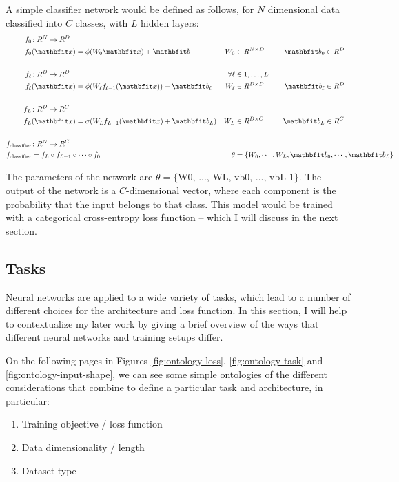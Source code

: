 A simple classifier network would be defined as follows, for $N$ dimensional data classified into $C$ classes, with $L$ hidden layers:
\begin{align}
\label{notation:classifier}
\begin{aligned}
    \vfdef{f_0}{N}{D} \\
    f_{0}&(\x) = \phi(W_0 \x) + \vb &
    W_0 &\in \R^{N\times D} &
    \vb_0 &\in \R^{D}
\\ \\%
    \vfdef{f_\l}{D}{D} & \forall \l &\in 1,\dots,L \quad \\
    f_\l&(\x) = \phi(W_\l f_{\l-1}(\x)) + \vb_\l &
    W_\l &\in \R^{D\times D} \quad &
    \vb_\l &\in \R^{D}
\\ \\%
    \vfdef{f_L}{D}{C} \\
    f_{L}&(\x) = \sigma(W_L f_{L-1}(\x) + \vb_L) &
    W_L &\in \R^{D \times C} &
    \vb_L &\in \R^{C}
\\ \\%
    \vfdef{f_{\text{classifier}}}{N}{C} \\
    f_{\text{classifier}}& = f_L \circ f_{L-1} \circ \cdots \circ f_0 &
    \theta &= \rlap{\{$W_0, \cdots, W_L, \vb_0, \cdots, \vb_L \} $}
\end{aligned}
\end{align}

The parameters of the network are $\theta = \{$W0, ..., WL, vb0, ..., vbL-1$\}$. The output of the network is a $C$-dimensional vector, where each component is the probability that the input belongs to that class. This model would be trained with a categorical cross-entropy loss function -- which I will discuss in the next section.

\vspace{5cm}

\pagebreak

\subsection{Tasks}

Neural networks are applied to a wide variety of tasks, which lead to a number of different choices for the architecture and loss function. In this section, I will help to contextualize my later work by giving a brief overview of the ways that different neural networks and training setups differ.

On the following pages in Figures \ref{fig:ontology-loss}, \ref{fig:ontology-task} and \ref{fig:ontology-input-shape}, we can see some simple ontologies of the different considerations that combine to define a particular task and architecture, in particular:
\begin{enumerate}
    \item Training objective / loss function
    \item Data dimensionality / length
    \item Dataset type
\end{enumerate}



